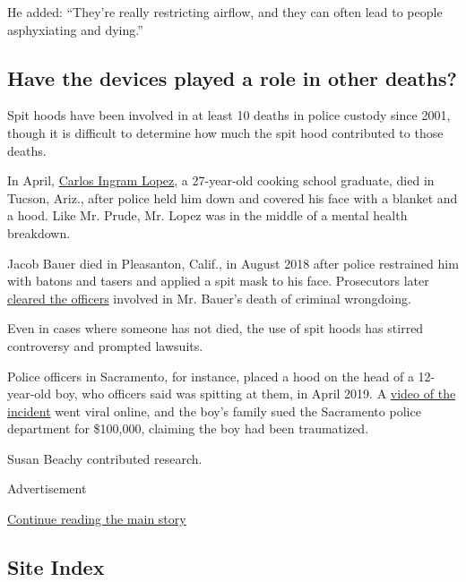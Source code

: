 He added: ``They're really restricting airflow, and they can often lead
to people asphyxiating and dying.''

\hypertarget{have-the-devices-played-a-role-in-other-deaths}{%
\subsection{Have the devices played a role in other
deaths?}\label{have-the-devices-played-a-role-in-other-deaths}}

Spit hoods have been involved in at least 10 deaths in police custody
since 2001, though it is difficult to determine how much the spit hood
contributed to those deaths.

In April,
\href{https://www.nytimes3xbfgragh.onion/2020/06/25/us/carlos-ingram-lopez-death-tucson-police.html}{Carlos
Ingram Lopez}, a 27-year-old cooking school graduate, died in Tucson,
Ariz., after police held him down and covered his face with a blanket
and a hood. Like Mr. Prude, Mr. Lopez was in the middle of a mental
health breakdown.

Jacob Bauer died in Pleasanton, Calif., in August 2018 after police
restrained him with batons and tasers and applied a spit mask to his
face. Prosecutors later
\href{https://www.pleasantonweekly.com/news/2020/03/20/pleasanton-pd-officers-cleared-of-criminal-charges-for-mans-death-after-confrontation-outside-raleys}{cleared
the officers} involved in Mr. Bauer's death of criminal wrongdoing.

Even in cases where someone has not died, the use of spit hoods has
stirred controversy and prompted lawsuits.

Police officers in Sacramento, for instance, placed a hood on the head
of a 12-year-old boy, who officers said was spitting at them, in April
2019. A
\href{https://www.sacbee.com/news/local/article236408518.html}{video of
the incident} went viral online, and the boy's family sued the
Sacramento police department for \$100,000, claiming the boy had been
traumatized.

Susan Beachy contributed research.

Advertisement

\protect\hyperlink{after-bottom}{Continue reading the main story}

\hypertarget{site-index}{%
\subsection{Site Index}\label{site-index}}

